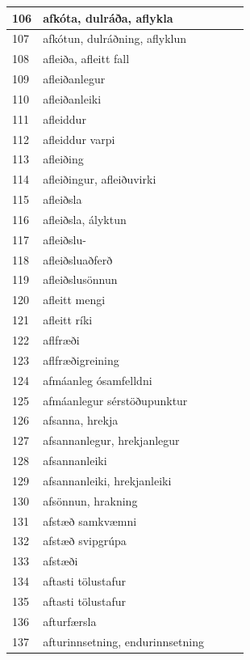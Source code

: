 \begin{longtable}{p{}|p{}|p{}|p{}|p{}}
\hline
106 & afkóta, dulráða, aflykla &  &  &  \\
\hline
107 & afkótun, dulráðning, aflyklun &  &  &  \\
\hline
108 & afleiða, afleitt fall &  &  &  \\
\hline
109 & afleiðanlegur &  &  &  \\
\hline
110 & afleiðanleiki &  &  &  \\
\hline
111 & afleiddur &  &  &  \\
\hline
112 & afleiddur varpi &  &  &  \\
\hline
113 & afleiðing &  &  &  \\
\hline
114 & afleiðingur, afleiðuvirki &  &  &  \\
\hline
115 & afleiðsla &  &  &  \\
\hline
116 & afleiðsla, ályktun &  &  &  \\
\hline
117 & afleiðslu- &  &  &  \\
\hline
118 & afleiðsluaðferð &  &  &  \\
\hline
119 & afleiðslusönnun &  &  &  \\
\hline
120 & afleitt mengi &  &  &  \\
\hline
121 & afleitt ríki &  &  &  \\
\hline
122 & aflfræði &  &  &  \\
\hline
123 & aflfræðigreining &  &  &  \\
\hline
124 & afmáanleg ósamfelldni &  &  &  \\
\hline
125 & afmáanlegur sérstöðupunktur &  &  &  \\
\hline
126 & afsanna, hrekja &  &  &  \\
\hline
127 & afsannanlegur, hrekjanlegur &  &  &  \\
\hline
128 & afsannanleiki &  &  &  \\
\hline
129 & afsannanleiki, hrekjanleiki &  &  &  \\
\hline
130 & afsönnun, hrakning &  &  &  \\
\hline
131 & afstæð samkvæmni &  &  &  \\
\hline
132 & afstæð svipgrúpa &  &  &  \\
\hline
133 & afstæði &  &  &  \\
\hline
134 & aftasti tölustafur &  &  &  \\
\hline
135 & aftasti tölustafur &  &  &  \\
\hline
136 & afturfærsla &  &  &  \\
\hline
137 & afturinnsetning, endurinnsetning &  &  &  \\

\end{longtable}
